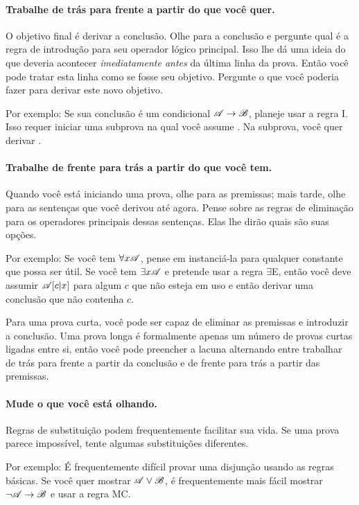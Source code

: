 \paragraph{Trabalhe de trás para frente a partir do que você quer.}
O objetivo final é derivar a conclusão. Olhe para a conclusão e pergunte qual é a regra de introdução para seu operador lógico principal. Isso lhe dá uma ideia do que deveria acontecer \emph{imediatamente antes} da última linha da prova. Então você pode tratar esta linha como se fosse seu objetivo. Pergunte o que você poderia fazer para derivar este novo objetivo.

Por exemplo: Se sua conclusão é um condicional $\mathscr{A}\rightarrow\mathscr{B}$, planeje usar a regra {\eif}I. Isso requer iniciar uma subprova na qual você assume . Na subprova, você quer derivar .

\paragraph{Trabalhe de frente para trás a partir do que você tem.}
Quando você está iniciando uma prova, olhe para as premissas; mais tarde, olhe para as sentenças que você derivou até agora. Pense sobre as regras de eliminação para os operadores principais dessas sentenças. Elas lhe dirão quais são suas opções.

Por exemplo: Se você tem $\forall x\mathscr{A}$, pense em instanciá-la para qualquer constante que possa ser útil. Se você tem $\exists x\mathscr{A}$ e pretende usar a regra $\exists$E, então você deve assumir $\mathscr{A}[c|x]$ para algum $c$ que não esteja em uso e então derivar uma conclusão que não contenha $c$.

Para uma prova curta, você pode ser capaz de eliminar as premissas e introduzir a conclusão. Uma prova longa é formalmente apenas um número de provas curtas ligadas entre si, então você pode preencher a lacuna alternando entre trabalhar de trás para frente a partir da conclusão e de frente para trás a partir das premissas.


\paragraph{Mude o que você está olhando.}
Regras de substituição podem frequentemente facilitar sua vida. Se uma prova parece impossível, tente algumas substituições diferentes.

Por exemplo: É frequentemente difícil provar uma disjunção usando as regras básicas. Se você quer mostrar $\mathscr{A}\vee\mathscr{B}$, é frequentemente mais fácil mostrar $\neg\mathscr{A}\rightarrow\mathscr{B}$ e usar a regra MC.


